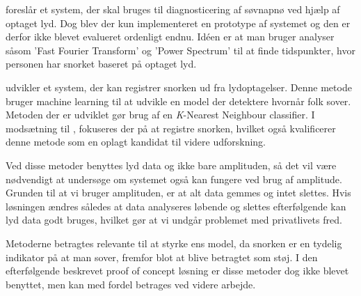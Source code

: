\citet{Calabrese20111101} foreslår et system, der skal bruges til diagnosticering af søvnapnø ved hjælp af optaget lyd.
Dog blev der kun implementeret en prototype af systemet og den er derfor ikke blevet evalueret ordenligt endnu. 
Idéen er at man bruger analyser såsom 'Fast Fourier Transform' og 'Power Spectrum' til at finde tidspunkter, hvor personen har snorket baseret på optaget lyd. 

\citet{7051338} udvikler et system, der kan registrer snorken ud fra lydoptagelser.
Denne metode bruger machine learning til at udvikle en model der detektere hvornår folk sover.
Metoden der er udviklet gør brug af en \textit{K}-Nearest Neighbour classifier.
I modsætning til \citet{Calabrese20111101}, fokuseres der på at registre snorken, hvilket også kvalificerer denne metode som en oplagt kandidat til videre udforskning.

Ved disse metoder benyttes lyd data og ikke bare amplituden, så det vil være nødvendigt at undersøge om systemet også kan fungere ved brug af amplitude.
Grunden til at vi bruger amplituden, er at alt data gemmes og intet slettes. 
Hvis løsningen ændres således at data analyseres løbende og slettes efterfølgende kan lyd data godt bruges, hvilket gør at vi undgår problemet med privatlivets fred.

Metoderne betragtes relevante til at styrke ens model, da snorken er en tydelig indikator på at man sover, fremfor blot at blive betragtet som støj.
I den efterfølgende beskrevet proof of concept løsning er disse metoder dog ikke blevet benyttet, men kan med fordel betrages ved videre arbejde.